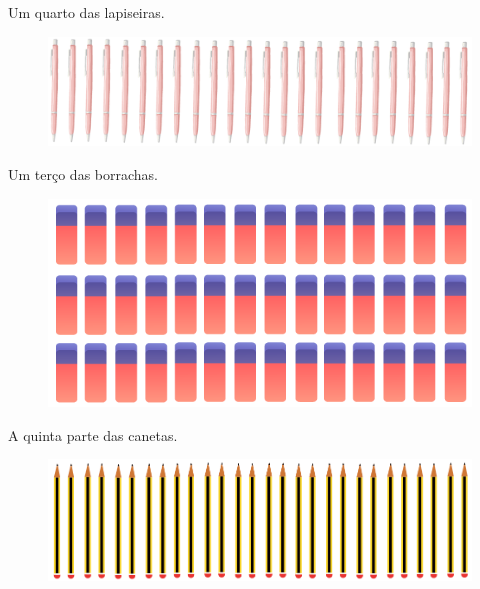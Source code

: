 \begin{escolha}
\item
  Um quarto das lapiseiras.

\begin{figure}[htpb!]
\includegraphics[width=\textwidth]{../ilustracoes/MAT5/SAEB_5ANO_MAT_figura70.png}
\end{figure}


\item
  Um terço das borrachas.

\begin{figure}[htpb!]
\includegraphics[width=\textwidth]{../ilustracoes/MAT5/SAEB_5ANO_MAT_figura71.png}
\end{figure}


\pagebreak
\item
  A quinta parte das canetas.

\begin{figure}[htpb!]
\includegraphics[width=\textwidth]{../ilustracoes/MAT5/SAEB_5ANO_MAT_figura72.png}
\end{figure}


\end{escolha}
